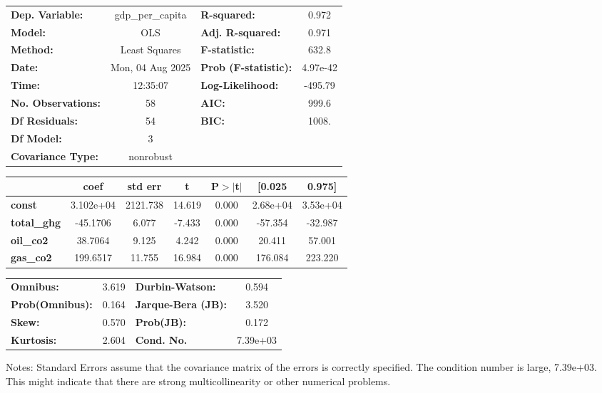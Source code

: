 \begin{center}
\begin{tabular}{lclc}
\toprule
\textbf{Dep. Variable:}    & gdp\_per\_capita & \textbf{  R-squared:         } &     0.972   \\
\textbf{Model:}            &       OLS        & \textbf{  Adj. R-squared:    } &     0.971   \\
\textbf{Method:}           &  Least Squares   & \textbf{  F-statistic:       } &     632.8   \\
\textbf{Date:}             & Mon, 04 Aug 2025 & \textbf{  Prob (F-statistic):} &  4.97e-42   \\
\textbf{Time:}             &     12:35:07     & \textbf{  Log-Likelihood:    } &   -495.79   \\
\textbf{No. Observations:} &          58      & \textbf{  AIC:               } &     999.6   \\
\textbf{Df Residuals:}     &          54      & \textbf{  BIC:               } &     1008.   \\
\textbf{Df Model:}         &           3      & \textbf{                     } &             \\
\textbf{Covariance Type:}  &    nonrobust     & \textbf{                     } &             \\
\bottomrule
\end{tabular}
\begin{tabular}{lcccccc}
                    & \textbf{coef} & \textbf{std err} & \textbf{t} & \textbf{P$> |$t$|$} & \textbf{[0.025} & \textbf{0.975]}  \\
\midrule
\textbf{const}      &    3.102e+04  &     2121.738     &    14.619  &         0.000        &     2.68e+04    &     3.53e+04     \\
\textbf{total\_ghg} &     -45.1706  &        6.077     &    -7.433  &         0.000        &      -57.354    &      -32.987     \\
\textbf{oil\_co2}   &      38.7064  &        9.125     &     4.242  &         0.000        &       20.411    &       57.001     \\
\textbf{gas\_co2}   &     199.6517  &       11.755     &    16.984  &         0.000        &      176.084    &      223.220     \\
\bottomrule
\end{tabular}
\begin{tabular}{lclc}
\textbf{Omnibus:}       &  3.619 & \textbf{  Durbin-Watson:     } &    0.594  \\
\textbf{Prob(Omnibus):} &  0.164 & \textbf{  Jarque-Bera (JB):  } &    3.520  \\
\textbf{Skew:}          &  0.570 & \textbf{  Prob(JB):          } &    0.172  \\
\textbf{Kurtosis:}      &  2.604 & \textbf{  Cond. No.          } & 7.39e+03  \\
\bottomrule
\end{tabular}
\end{center}

Notes: \newline
 [1] Standard Errors assume that the covariance matrix of the errors is correctly specified. \newline
 [2] The condition number is large, 7.39e+03. This might indicate that there are \newline
 strong multicollinearity or other numerical problems.